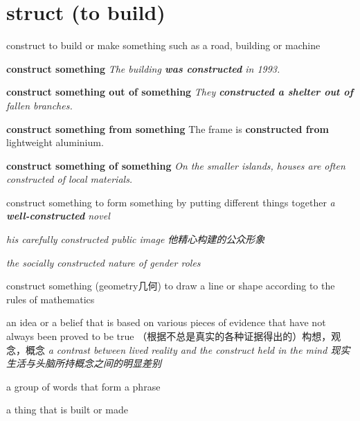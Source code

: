 \section{struct (to build)}

\begin{DefWord}{construct}
    to build or make something such as a road, building or machine
    
    \textbf{construct something}
    \textit{The building \textbf{was constructed} in 1993.}
    
    \textbf{construct something out of something}
    \textit{They \textbf{constructed a shelter out of} fallen branches.}

    \textbf{construct something from something}
    The frame is \textbf{constructed from} lightweight aluminium.

    \textbf{construct something of something}
    \textit{On the smaller islands, houses are often constructed of local materials.}

    construct something to form something by putting different things together
    \textit{a \textbf{well-constructed} novel}

    \textit{his carefully constructed public image 他精心构建的公众形象}

    \textit{the socially constructed nature of gender roles}

    construct something (geometry几何) to draw a line or shape according to the rules of mathematics


    an idea or a belief that is based on various pieces of evidence that have not always been proved to be true （根据不总是真实的各种证据得出的）构想，观念，概念
    \textit{a contrast between lived reality and the construct held in the mind 现实生活与头脑所持概念之间的明显差别}

    a group of words that form a phrase

    a thing that is built or made

    
\end{DefWord}

